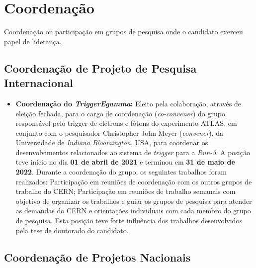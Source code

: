 \newpage

\section{Coordenação}

Coordenação ou participação em grupos de pesquisa onde o candidato exerceu papel de liderança.


\subsection{Coordenação de Projeto de Pesquisa Internacional}

\begin{itemize}

\item \textbf{Coordenação do \textbf{\emph{TriggerEgamma}}:} Eleito pela colaboração, através de eleição fechada, para o cargo de coordenação (\emph{co-convener}) do grupo responsável pelo trigger de elétrons e fótons do experimento ATLAS, em conjunto com o pesquisador Christopher John Meyer (\emph{convener}), da Universidade de \emph{Indiana Bloomington}, USA, para coordenar os desenvolvimentos relacionados ao sistema de \emph{trigger} para a \emph{Run-3}. A posição teve início no dia \textbf{01 de abril de 2021} e terminou em \textbf{31 de maio de 2022}. Durante a coordenação do grupo, os seguintes trabalhos foram realizados: Participação em reuniões de coordenação com os outros grupos de trabalho do CERN; Participação em reuniões de trabalho semanais com objetivo de organizar os trabalhos e guiar os grupos de pesquisa para atender as demandas do CERN e orientações individuais com cada membro do grupo de pesquisa. Esta posição teve forte influência dos trabalhos desenvolvidos pela tese de doutorado do candidato.

\end{itemize}


\subsection{Coordenação de Projetos Nacionais}

